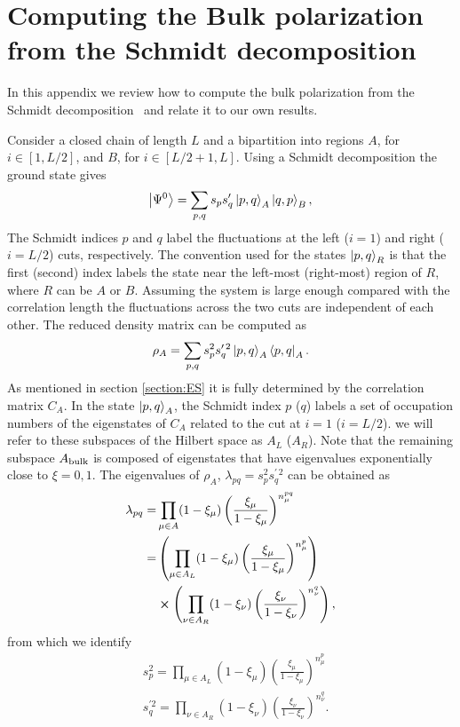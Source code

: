 \documentclass[twocolumn,amsmath,longbibliography,amssymb,superscriptaddress]{revtex4-1}
\begin{document}
\section{Computing the Bulk polarization from the Schmidt decomposition}\label{app:pollmann}

In this appendix we review  how to compute the bulk polarization from the Schmidt decomposition~\cite{Zaletel2014} and relate it to our own results.

Consider a closed chain of length $L$ and a bipartition into regions $A$, for $i\in [1,L/2]$, and $B$, for $i \in [L/2+1,L]$. Using a Schmidt decomposition the ground state gives
\begin{equation}
\ket{\Psi^0} = \sum_{p,q} s_p s'_q \ket{p,q}_A \ket{q,p}_B,
\end{equation}
The Schmidt indices $p$ and $q$ label the fluctuations at the left ($i=1$) and right ($i=L/2$) cuts, respectively. The convention used for the states $\ket{p,q}_{R}$ is that the first (second) index labels the state near the left-most (right-most) region of $R$, where $R$ can be $A$ or $B$. Assuming the system is large enough compared with the correlation length the fluctuations across the two cuts are independent of each other. The reduced density matrix can be computed as
\begin{equation}
\rho_A = \sum_{p,q} s_p^2 s^{\prime \, 2}_q \ket{p,q}_{A}\bra{p,q}_A .
\end{equation}
As mentioned in section \ref{section:ES} it is fully determined by the correlation matrix $C_A$. In the state $\ket{p,q}_A$, the Schmidt index $p$ ($q$) labels a set of occupation numbers of the eigenstates of $C_A$ related to the cut at $i=1$ ($i=L/2$). we will refer to these subspaces of the Hilbert space as $A_L$ ($A_R$). Note that the remaining subspace $A_{\rm bulk}$ is composed of eigenstates that have eigenvalues exponentially close to $\xi = 0,1$. The eigenvalues of $\rho_A$, $\lambda_{pq}=s_p^2 s_q^{\prime \, 2}$ can be obtained as \cite{Alexandrinata2011}
\begin{align}
\lambda_{pq} =& \prod_{\mu \in A} (1-\xi_\mu)\left(\frac{\xi_\mu}{1-\xi_\mu}\right)^{n_\mu^{pq}}\nonumber \\
=&\left(\prod_{\mu\in A_L} (1-\xi_\mu)\left(\frac{\xi_\mu}{1-\xi_\mu}\right)^{n_\mu^{p}} \right) \nonumber\\
&\cross \left(\prod_{\nu \in A_R} (1-\xi_\nu)\left(\frac{\xi_\nu}{1-\xi_\nu}\right)^{n_\nu^{q}} \right) ,
\label{eq:Alexandrinata}
\end{align}
from which we identify 
\begin{align}
&s_p^2 = \prod_{\mu\in A_L} (1-\xi_\mu)\left(\frac{\xi_\mu}{1-\xi_\mu}\right)^{n_\mu^{p}} \nonumber \\
&s_q^{\prime 2} = \prod_{\nu \in A_R} (1-\xi_\nu)\left(\frac{\xi_\nu}{1-\xi_\nu}\right)^{n_\nu^{q}}.
\label{eq:spsq_A}
\end{align}
\end{document}
